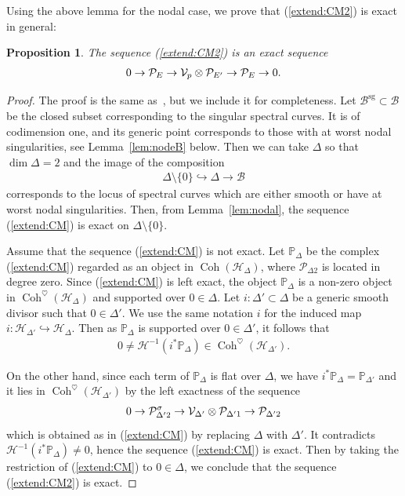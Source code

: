 \documentclass[11pt,oneside,a4paper,mathscr]{amsart}
\newtheorem{prop}[thm]{Proposition}
\theoremstyle{definition}
\newcommand{\cH}{\mathcal{H}}
\newcommand{\cB}{\mathcal{B}}
\newcommand{\cP}{\mathcal{P}}
\newcommand{\Coh}{\operatorname{Coh}}
\begin{document}
Using the above lemma for the nodal case, we prove that (\ref{extend:CM2}) is exact 
in general:
\begin{prop}\label{prop:exact2}
The sequence (\ref{extend:CM2}) is an exact sequence
\begin{align}\notag
0\to \cP_E \to \mathcal{V}_p\otimes \cP_{E'} \to \cP_E \to 0.
\end{align}
\end{prop}
\begin{proof}
The proof is the same as~\cite[Proposition~5.11]{TodaGL2}, but we include it for completeness.
Let $\cB^{\mathrm{sg}} \subset \cB$ be the closed subset corresponding 
to the singular spectral curves. It is of codimension one, and its 
generic point corresponds to those with at worst nodal singularities, see Lemma~\ref{lem:nodeB} below. 
Then we can take $\Delta$ so that $\dim \Delta =2$ and 
the image of the composition 
\begin{align*}\Delta \setminus \{0\} \hookrightarrow \Delta \to \cB
\end{align*}
corresponds to the locus of spectral curves which are either smooth or have at worst nodal singularities. Then, from Lemma~\ref{lem:nodal}, the sequence (\ref{extend:CM}) is 
exact on $\Delta \setminus \{0\}$. 

Assume that the sequence (\ref{extend:CM}) is not exact.
Let $\mathbb{P}_{\Delta}$ be the complex (\ref{extend:CM})
regarded as an object in $\Coh(\cH_{\Delta})$, where 
$\cP_{\Delta 2}$ is located in degree zero. 
Since (\ref{extend:CM}) is left exact, the object $\mathbb{P}_{\Delta}$ is a non-zero object
in $\Coh^{\heartsuit}(\cH_{\Delta})$ and supported 
over $0\in \Delta$. 
Let $i \colon \Delta' \subset \Delta$ be a generic smooth divisor 
such that $0\in \Delta'$.
We use the same notation $i$ for the induced map $i \colon \cH_{\Delta'} \hookrightarrow \cH_{\Delta}$. 
Then as $\mathbb{P}_{\Delta}$ is supported over $0\in \Delta'$, 
it follows that 
\begin{align*}
0\neq \cH^{-1}(i^* \mathbb{P}_{\Delta}) \in \Coh^{\heartsuit}(\cH_{\Delta'}).
\end{align*}

On the other hand, 
since each term of $\mathbb{P}_{\Delta}$ is flat over $\Delta$, 
we have $i^* \mathbb{P}_{\Delta}=\mathbb{P}_{\Delta'}$ and it 
lies in $\Coh^{\heartsuit}(\cH_{\Delta'})$ by
the left exactness of
the sequence 
   \begin{align}\notag
        0\to \cP_{\Delta' 2}^{\sigma}\to \mathcal{V}_{\Delta'}\otimes \cP_{\Delta' 1}
        \to \cP_{\Delta' 2}
    \end{align}
    which is obtained as in 
(\ref{extend:CM}) by replacing $\Delta$ with $\Delta'$. 
It contradicts $\cH^{-1}(i^*\mathbb{P}_{\Delta})\neq 0$,
hence the sequence (\ref{extend:CM}) is exact. 
Then by taking the restriction of (\ref{extend:CM}) to $0\in \Delta$, 
we conclude that the sequence (\ref{extend:CM2}) is exact. 
\end{proof}
\end{document}
